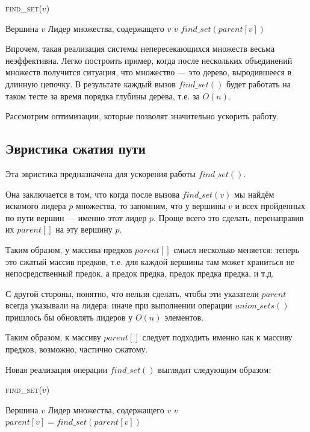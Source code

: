 \documentclass[a4paper,12pt]{article}
\newcommand{\algname}[1]{\textsc{#1}}
\begin{document}
\begin{algorithm}
  	\caption{\algname{find\_set}($v$)}
	\begin{algorithmic}
	    \Require Вершина $v$
	    \Ensure Лидер множества, содержащего $v$
	    \State
	        \State \Return $v$
	   \EndIf
	   \State \Return $find\_set(parent[v])$
	\end{algorithmic}
\end{algorithm}


Впрочем, такая реализация системы непересекающихся множеств весьма неэффективна. Легко построить пример, когда после нескольких объединений множеств получится ситуация, что множество — это дерево, выродившееся в длинную цепочку. В результате каждый вызов $ find\_set()$ будет работать на таком тесте за время порядка глубины дерева, т.е. за $O(n)$.

Рассмотрим оптимизации, которые позволят значительно ускорить работу.

\subsection{Эвристика сжатия пути}

Эта эвристика предназначена для ускорения работы $ find\_set()$.

Она заключается в том, что когда после вызова $find\_set(v)$ мы найдём искомого лидера $p$ множества, то запомним, что у вершины $v$ и всех пройденных по пути вершин — именно этот лидер $p$. Проще всего это сделать, перенаправив их $parent[]$ на эту вершину $p$.

Таким образом, у массива предков $parent[]$ смысл несколько меняется: теперь это сжатый массив предков, т.е. для каждой вершины там может храниться не непосредственный предок, а предок предка, предок предка предка, и т.д.

С другой стороны, понятно, что нельзя сделать, чтобы эти указатели $parent$ всегда указывали на лидера: иначе при выполнении операции $union\_sets()$ пришлось бы обновлять лидеров у $O(n)$ элементов.

Таким образом, к массиву $parent[]$ следует подходить именно как к массиву предков, возможно, частично сжатому.

Новая реализация операции $find\_set()$ выглядит следующим образом:

\begin{algorithm}
  	\caption{\algname{find\_set}($v$)}
	\begin{algorithmic}
	    \Require Вершина $v$
	    \Ensure Лидер множества, содержащего $v$
	    \State
	    \If{$parent[v] == v$}
	        \State \Return $v$
	   \EndIf
	   \State \Return $parent[v] = find\_set(parent[v])$
	\end{algorithmic}
\end{algorithm}
\end{document}
